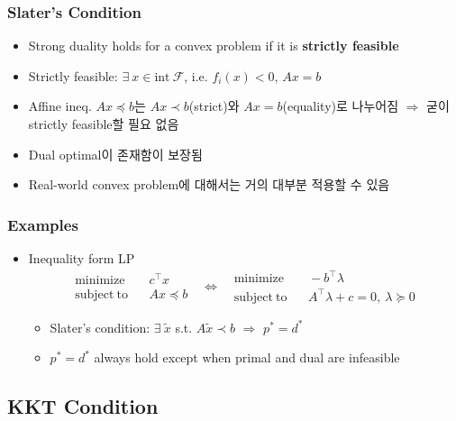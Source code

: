 \subsubsection*{Slater's Condition}
\begin{itemize}
    \item Strong duality holds for a convex problem if it is \textbf{strictly feasible}
    \item Strictly feasible: $\exists~x\in\mathrm{int}~\mathcal{F}$, i.e. $f_i(x)<0$, $Ax=b$
    \item Affine ineq. $Ax\preceq b$는 $Ax\prec b$(strict)와 $Ax=b$(equality)로 나누어짐 $\Rightarrow$ 굳이 strictly feasible할 필요 없음
    \item Dual optimal이 존재함이 보장됨
    \item Real-world convex problem에 대해서는 거의 대부분 적용할 수 있음
\end{itemize}

\subsubsection*{Examples}
\begin{itemize}
    \item Inequality form LP
    \begin{equation}\begin{aligned}
        \mathrm{minimize}~~&~~c^{\top}x \\
        \mathrm{subject~to}~~&~~Ax\preceq b
    \end{aligned}~~~\Leftrightarrow~~~\begin{aligned}
        \mathrm{minimize}~~&~~-b^{\top}\lambda \\
        \mathrm{subject~to}~~&~~A^{\top}\lambda+c=0,~\lambda\succeq 0
    \end{aligned}\end{equation}
    \begin{itemize}
        \item Slater's condition: $\exists~\tilde{x}$ s.t. $A\tilde{x}\prec b$ $\Rightarrow$ $p^\ast=d^\ast$
        \item $p^\ast=d^\ast$ always hold except when primal and dual are infeasible
    \end{itemize}
\end{itemize}

\subsection{KKT Condition}
